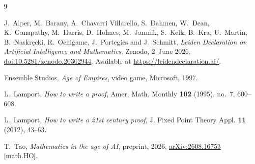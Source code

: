 \documentclass[11pt]{article}
\newcommand{\eogonek}{{\fontencoding{T1}\selectfont\k{e}}}%
\theoremstyle{plain}
\theoremstyle{definition}
\theoremstyle{remark}
\theoremstyle{definition}
\theoremstyle{plain}
\theoremstyle{remark}
\begin{document}
\begin{thebibliography}{9}

J.~Alper, M.~Barany, A.~Chavarri Villarello, S.~Dahmen, W.~Dean, K.~Ganapathy, M.~Harris, D.~Holmes, M.~Jamnik, S.~Kelk, B.~Kra, U.~Martin, B.~Naskr\eogonek cki, R.~Ochigame, J.~Portegies and J.~Schmitt, \emph{Leiden Declaration on Artificial Intelligence and Mathematics}, Zenodo, 2~June 2026, \href{https://doi.org/10.5281/zenodo.20302944}{doi:10.5281/zenodo.20302944}. Available at \url{https://leidendeclaration.ai/}.

Ensemble Studios, \emph{Age of Empires}, video game, Microsoft, 1997.

L.~Lamport, \emph{How to write a proof}, Amer. Math. Monthly \textbf{102} (1995), no.~7, 600--608.

L.~Lamport, \emph{How to write a 21st century proof}, J. Fixed Point Theory Appl. \textbf{11} (2012), 43--63.

T.~Tao, \emph{Mathematics in the age of AI}, preprint, 2026, \href{https://arxiv.org/abs/2608.16753}{arXiv:2608.16753} [math.HO].

\end{thebibliography}
\end{document}
